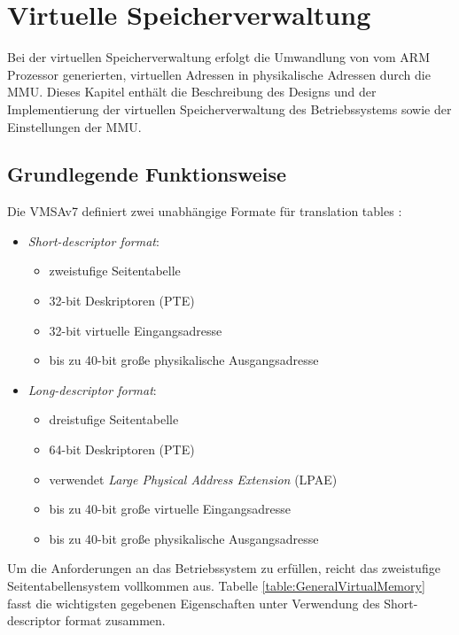 \section{Virtuelle Speicherverwaltung}
\label{chapVirtualMemory}
Bei der virtuellen Speicherverwaltung erfolgt die Umwandlung von vom ARM Prozessor generierten, virtuellen Adressen in physikalische Adressen durch die \ac{MMU}. Dieses Kapitel enthält die Beschreibung des Designs und der Implementierung der virtuellen Speicherverwaltung des Betriebssystems sowie der Einstellungen der MMU.\\

\subsection{Grundlegende Funktionsweise}

Die \ac{VMSAv7} definiert zwei unabhängige Formate für translation tables \cite[S. B3-1318]{ARM:ARM}:

\begin{itemize}
	\item \emph{Short-descriptor format}:
	\begin{itemize}
		\item zweistufige Seitentabelle 
		\item 32-bit Deskriptoren (PTE)
		\item 32-bit virtuelle Eingangsadresse 
		\item bis zu 40-bit große physikalische Ausgangsadresse
	\end{itemize}
	\item \emph{Long-descriptor format}:
	\begin{itemize}
		\item dreistufige Seitentabelle
		\item 64-bit Deskriptoren (\acs{PTE})
		\item verwendet \emph{Large Physical Address Extension} (LPAE)
		\item bis zu 40-bit große virtuelle Eingangsadresse 
		\item bis zu 40-bit große physikalische Ausgangsadresse
	\end{itemize}
\end{itemize}

Um die Anforderungen an das Betriebssystem zu erfüllen, reicht das zweistufige Seitentabellensystem vollkommen aus. Tabelle \ref{table:GeneralVirtualMemory} fasst die wichtigsten gegebenen Eigenschaften unter Verwendung des Short-descriptor format zusammen.\\

